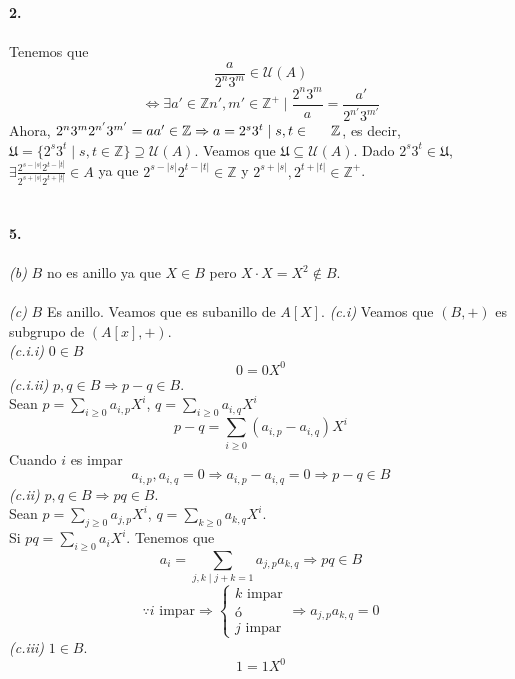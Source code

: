 \documentclass{article}
\begin{document}
\begin{multicols}{2}
\noindent
\textbf{2.}\\\\
\indent Tenemos que
$$
\frac{a}{2^n3^m} \in \mathcal{U} (A)
$$
$$
\Leftrightarrow \exists a'\in \mathbb{Z} n',m'\in\mathbb{Z}^+ \mid \frac{2^n 3^m}{a} = \frac{a'}{2^{n'} 3^{m'}}
$$
\indent Ahora, $2^n 3^m2^{n'} 3^{m'}=aa'\in \mathbb{Z} \Rightarrow a = 2^s3^t \mid s,t\in \indent \mathbb{Z}$, es decir, $\mathfrak{U}=\{2^s3^t \mid s,t\in \mathbb{Z}\} \supseteq \mathcal{U}(A)$. Veamos \indent que $\mathfrak{U} \subseteq \mathcal{U}(A)$. Dado $2^s3^t\in \mathfrak{U}$, $\exists \frac{2^{s-|s|}2^{t-|t|}}{2^{s+|s|}2^{t+|t|}}\in A$ \indent ya que $2^{s-|s|}2^{t-|t|}\in \mathbb{Z}$ y $2^{s+|s|},2^{t+|t|}\in \mathbb{Z}^+$.\\\\\\


\noindent
\textbf{5.}\\\\
\textit{(b)} $B$ no es anillo ya que $X\in B$ pero $X \cdot X = X^2 \notin B$.\\\\
\textit{(c)} $B$ Es anillo. Veamos que es subanillo de $A[X]$.
\indent \textit{(c.i)} Veamos que $(B,+)$ es subgrupo de $(A[x], +)$.\\
\indent \indent \textit{(c.i.i)} $0\in B$
$$
0 = 0 X^0
$$
\indent \indent \textit{(c.i.ii)} $p,q \in B \Rightarrow p-q \in B$.\\
\indent \indent \indent Sean $p = \sum_{i\ge0} a_{i,p}X^i$, $q = \sum_{i\ge0} a_{i,q}X^i$
$$
p-q = \sum_{i\ge0} (a_{i,p}-a_{i,q}) X^i
$$
\indent \indent \indent Cuando $i$ es impar
$$
a_{i,p},a_{i,q}=0 \Rightarrow a_{i,p}-a_{i,q}=0 \Rightarrow p-q \in B
$$
\indent \textit{(c.ii)} $p,q\in B \Rightarrow pq \in B$.\\
\indent \indent Sean $p = \sum_{j\ge0} a_{j,p}X^i$, $q = \sum_{k\ge0} a_{k,q}X^i$.\\
\indent \indent Si $pq= \sum_{i\ge0} a_iX^i$. Tenemos que
$$
a_i = \sum_{j,k \mid j+k = 1} a_{j,p} a_{k,q} \Rightarrow pq \in B
$$
$$
\because i \text{ impar} \Rightarrow
\left\{\begin{array}{l}
    k \text{ impar}\\
    \text{ó}\\
    j \text{ impar}
\end{array}\right.
\Rightarrow a_{j,p} a_{k,q} = 0
$$
\indent \textit{(c.iii)} $1\in B$.
$$
1 = 1 X^0
$$



\end{multicols}
\end{document}
